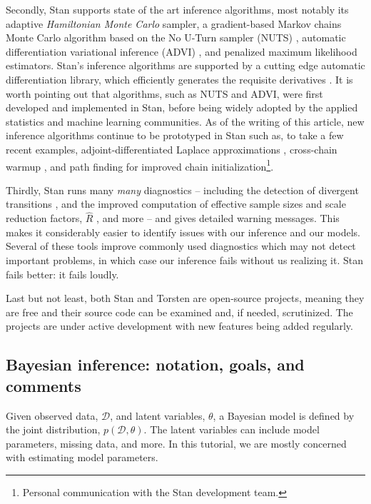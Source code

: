 Secondly, Stan supports state of the art inference algorithms, most notably its adaptive \textit{Hamiltonian Monte Carlo} sampler, a gradient-based Markov chains Monte Carlo algorithm \citep{Betancourt:2018} based on the No U-Turn sampler (NUTS) \cite{Hoffman:2014}, automatic differentiation variational inference (ADVI) \cite{Kucukelbir:2017}, and penalized maximum likelihood estimators.
Stan's inference algorithms are supported by a cutting edge automatic differentiation library, which efficiently generates the requisite derivatives \cite{Carpenter:2015}.
It is worth pointing out that algorithms, such as NUTS and ADVI, were first developed and implemented in Stan, before being widely adopted by the applied statistics and machine learning communities.
As of the writing of this article, new inference algorithms continue to be prototyped in Stan such as, to take a few recent examples, adjoint-differentiated Laplace approximations \cite{Margossian:2020}, cross-chain warmup \cite{Zhang:2020}, and path finding for improved chain initialization\footnote{Personal communication with the Stan development team.}.

Thirdly, Stan runs many \textit{many} diagnostics -- including the detection of divergent transitions \cite{Betancourt:2018}, and the improved computation of effective sample sizes and scale reduction factors, $\hat R$ \cite{Vehtari:2020}, and more -- and gives detailed warning messages.
This makes it considerably easier to identify issues with our inference and our models.
Several of these tools improve commonly used diagnostics which may not detect important problems, in which case our inference fails without us realizing it.
Stan fails better: it fails loudly. 

Last but not least, both Stan and Torsten are open-source projects, meaning  they are free and their source code can be examined and, if needed, scrutinized. 
The projects are under active development with new features being added regularly.

\subsection{Bayesian inference: notation, goals, and comments}

Given observed data, $\mathcal D$, and latent variables, $\theta$, a Bayesian model is defined by the joint distribution, $p(\mathcal D, \theta)$.
The latent variables can include model parameters, missing data, and more.
In this tutorial, we are mostly concerned with estimating model parameters.

